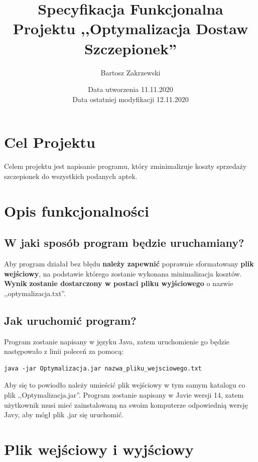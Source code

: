 \documentclass{article}
\title {Specyfikacja Funkcjonalna Projektu ,,Optymalizacja Dostaw Szczepionek''}
\author{Bartosz Zakrzewski}
\date{Data utworzenia 11.11.2020 \\ Data ostatniej modyfikacji 12.11.2020}
\begin{document}
\maketitle
\thispagestyle{empty}

\clearpage
\tableofcontents
\thispagestyle{empty}

\clearpage

\section{Cel Projektu}

Celem projektu jest napisanie programu, który zminimalizuje koszty sprzedaży szczepionek do wszystkich podanych aptek.

\section{Opis funkcjonalności}

\subsection{W jaki sposób program będzie uruchamiany?}
Aby program działał bez błędu \textbf{należy zapewnić} poprawnie sformatowany \textbf{plik wejściowy}, na podstawie którego zostanie wykonana minimalizacja kosztów. \textbf{Wynik} \textbf{zostanie dostarczony w postaci pliku wyjściowego} o nazwie ,,optymalizacja.txt''.

\subsection{Jak uruchomić program?}

Program zostanie napisany w języku Java, zatem uruchomienie go będzie następowało z linii poleceń za pomocą: 
\begin{lstlisting}
java -jar Optymalizacja.jar nazwa_pliku_wejsciowego.txt
\end{lstlisting}
Aby się to powiodło należy umieścić plik wejściowy w tym samym katalogu co plik ,,Optymalizacja.jar''.
Program zostanie napisany w Javie wersji 14, zatem użytkownik musi mieć zainstalowaną na swoim komputerze odpowiednią wersję Javy, aby mógł plik .jar się uruchomić.

\clearpage
\section{Plik wejściowy i wyjściowy}
\end{document}
